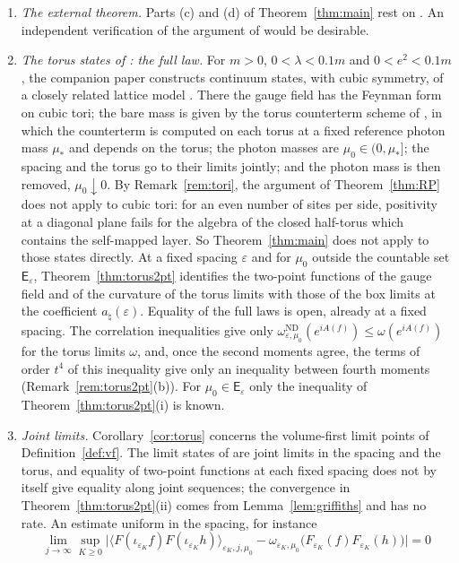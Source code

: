 \documentclass[11pt]{amsart}
\theoremstyle{plain}
\theoremstyle{definition}
\theoremstyle{remark}
\numberwithin{equation}{section}
\newcommand{\eps}{\varepsilon}
\newcommand{\ev}[1]{\langle #1\rangle}
\begin{document}
\begin{enumerate}
\item \emph{The external theorem.} Parts (c) and (d) of Theorem~\ref{thm:main} rest on \cite[Prop.~18.1, Thm.~18.21]{S}. An independent verification of the argument of \cite[Section~18]{S} would be desirable.
\item\label{op:law} \emph{The torus states of \cite{v1}: the full law.} For $m>0$, $0<\lambda<0.1m$ and $0<e^2<0.1m$, the companion paper \cite{v1} constructs continuum states, with cubic symmetry, of a closely related lattice model \cite[Thm.~3.1]{v1}. There the gauge field has the Feynman form on cubic tori; the bare mass is given by the torus counterterm scheme of \cite[Def.~2.2]{v1}, in which the counterterm is computed on each torus at a fixed reference photon mass $\mu_*$ and depends on the torus; the photon masses are $\mu_0\in(0,\mu_*]$; the spacing and the torus go to their limits jointly; and the photon mass is then removed, $\mu_0\downarrow0$. By Remark~\ref{rem:tori}, the argument of Theorem~\ref{thm:RP} does not apply to cubic tori: for an even number of sites per side, positivity at a diagonal plane fails for the algebra of the closed half-torus which contains the self-mapped layer. So Theorem~\ref{thm:main} does not apply to those states directly. At a fixed spacing $\eps$ and for $\mu_0$ outside the countable set $\mathsf E_\eps$, Theorem~\ref{thm:torus2pt} identifies the two-point functions of the gauge field and of the curvature of the torus limits with those of the box limits at the coefficient $a_\natural(\eps)$. Equality of the full laws is open, already at a fixed spacing. The correlation inequalities give only $\omega^{\mathrm{ND}}_{\eps,\mu_0}(e^{iA(f)})\le\omega(e^{iA(f)})$ for the torus limits $\omega$, and, once the second moments agree, the terms of order $t^4$ of this inequality give only an inequality between fourth moments (Remark~\ref{rem:torus2pt}(b)). For $\mu_0\in\mathsf E_\eps$ only the inequality of Theorem~\ref{thm:torus2pt}(i) is known.
\item\label{op:joint} \emph{Joint limits.} Corollary~\ref{cor:torus} concerns the volume-first limit points of Definition~\ref{def:vf}. The limit states of \cite[Thm.~3.1(ii)]{v1} are joint limits in the spacing and the torus, and equality of two-point functions at each fixed spacing does not by itself give equality along joint sequences; the convergence in Theorem~\ref{thm:torus2pt}(ii) comes from Lemma~\ref{lem:griffiths} and has no rate. An estimate uniform in the spacing, for instance
\[
\lim_{j\to\infty}\sup_{K\ge0}\Big|\ev{F(\iota_{\eps_K}f)F(\iota_{\eps_K}h)}_{\eps_K,j,\mu_0}-\omega_{\eps_K,\mu_0}\big(F_{\eps_K}(f)F_{\eps_K}(h)\big)\Big|=0
\]
\end{enumerate}
\end{document}
